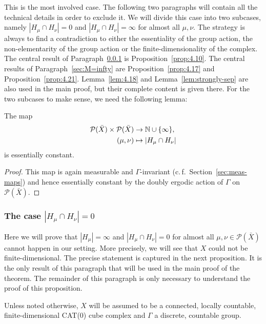 This is the most involved case. The following two paragraphs will contain all the technical details in order to exclude it. We will divide this case into two subcases, namely \(|H_\mu \cap H_\nu| = 0\) and \(|H_\mu \cap H_\nu| = \infty\) for almost all \(\mu, \nu\). The strategy is always to find a contradiction to either the essentiality of the group action, the non-elementarity of the group action or the finite-dimensionality of the complex. The central result of Paragraph~\ref{sec:M=0} is Proposition~\ref{prop:4.10}. The central results of Paragraph~\ref{sec:M=infty} are Proposition~\ref{prop:4.17} and Proposition~\ref{prop:4.21}. Lemma~\ref{lem:4.18} and Lemma~\ref{lem:strongly-sep} are also used in the main proof, but their complete content is given there.
For the two subcases to make sense, we need the following lemma:

\begin{lemma}
  \label{lem:hh-const}
  The map
  \begin{align*}
    \mathcal{P}(\bar X) \times \mathcal{P}(\bar X) &\to \mathbb{N} \cup \{\infty\},\\
    (\mu, \nu) &\mapsto |H_\mu \cap H_\nu|
  \end{align*}
  is essentially constant.
\end{lemma}

\begin{proof}
  This map is again measurable and \(\Gamma\)-invariant (c.\,f.~Section~\ref{sec:meas-maps}) and hence essentially constant by the doubly ergodic action of \(\Gamma\) on \(\mathcal{P}(\bar X)\).
\end{proof}

\subsubsection{The case \(|H_\mu \cap H_\nu| = 0\)}
\label{sec:M=0}

Here we will prove that \(|H_\mu| = \infty\) and \(|H_\mu \cap H_\nu| = 0\) for almost all \(\mu, \nu \in \mathcal{P}(\bar X)\) cannot happen in our setting. More precisely, we will see that \(X\) could not be finite-dimensional. The precise statement is captured in the next proposition. It is the only result of this paragraph that will be used in the main proof of the theorem. The remainder of this paragraph is only necessary to understand the proof of this proposition.

Unless noted otherwise, \(X\) will be assumed to be a connected, locally countable, finite-dimensional CAT(0) cube complex and \(\Gamma\) a discrete, countable group.

